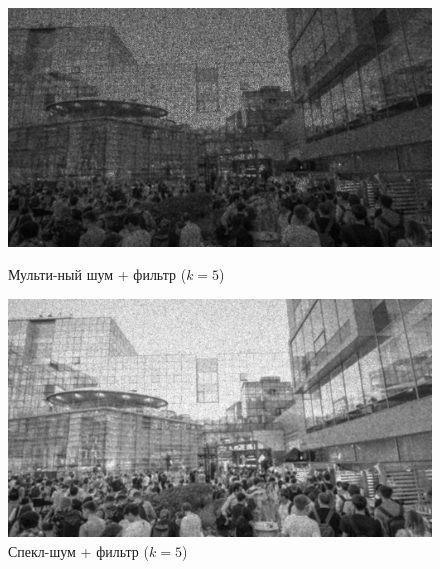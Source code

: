 \documentclass[a4paper]{article}
\begin{document}
\begin{figure}[H]
    \begin{minipage}{0.49\textwidth}
        \centering \includegraphics[width=\textwidth]{images/3_nonlinear_filters/multiplicative - wiener (k=5).jpg}
        \caption{Мульти-ный шум + фильтр ($k = 5$)}
    \end{minipage}\hfill
    \begin{minipage}{0.49\textwidth}
        \centering \includegraphics[width=\textwidth]{images/3_nonlinear_filters/speckle - wiener (k=5).jpg}
        \caption{Спекл-шум + фильтр ($k = 5$)}
    \end{minipage}
\end{figure}
\end{document}
